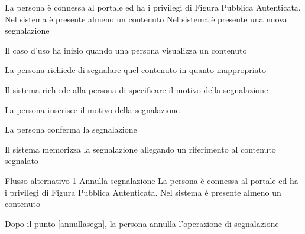{}
{La persona è connessa al portale ed ha i privilegi di Figura Pubblica Autenticata. Nel sistema è presente almeno un \gls{contenuto}}
{Nel sistema è presente una nuova segnalazione}
{\begin{enumCU}
	\item Il caso d'uso ha inizio quando una persona visualizza un \gls{contenuto}
	\item La persona richiede di segnalare quel \gls{contenuto} in quanto inappropriato
	\item Il sistema richiede alla persona di specificare il motivo della segnalazione
	\item La persona inserisce il motivo della segnalazione\label{annullasegn}
	\item La persona conferma la segnalazione
	\item Il sistema memorizza la segnalazione allegando un \gls{riferimento} al contenuto segnalato
\end{enumCU}}
%
{Flusso alternativo 1}%
{Annulla segnalazione}%
{La persona è connessa al portale ed ha i privilegi di Figura Pubblica Autenticata. Nel sistema è presente almeno un \gls{contenuto}}
{\postNulle}%
{\begin{enumCU}
		\item Dopo il punto \ref{annullasegn}, la persona annulla l'operazione di segnalazione
	\end{enumCU}}%


